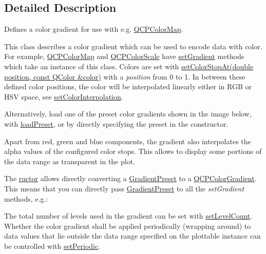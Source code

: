 \subsection{Detailed Description}
Defines a color gradient for use with e.\+g. \hyperlink{class_q_c_p_color_map}{Q\+C\+P\+Color\+Map}. 

This class describes a color gradient which can be used to encode data with color. For example, \hyperlink{class_q_c_p_color_map}{Q\+C\+P\+Color\+Map} and \hyperlink{class_q_c_p_color_scale}{Q\+C\+P\+Color\+Scale} have \hyperlink{class_q_c_p_color_map_a7313c78360471cead3576341a2c50377}{set\+Gradient} methods which take an instance of this class. Colors are set with \hyperlink{class_q_c_p_color_gradient_a3b48be5e78079db1bb2a1188a4c3390e}{set\+Color\+Stop\+At(double position, const Q\+Color \&color)} with a {\itshape position} from 0 to 1. In between these defined color positions, the color will be interpolated linearly either in R\+GB or H\+SV space, see \hyperlink{class_q_c_p_color_gradient_aa13fda86406e1d896a465a409ae63b38}{set\+Color\+Interpolation}.

Alternatively, load one of the preset color gradients shown in the image below, with \hyperlink{class_q_c_p_color_gradient_aa0aeec1528241728b9671bf8e60b1622}{load\+Preset}, or by directly specifying the preset in the constructor.

Apart from red, green and blue components, the gradient also interpolates the alpha values of the configured color stops. This allows to display some portions of the data range as transparent in the plot.



The \hyperlink{class_q_c_p_color_gradient}{ructor} allows directly converting a \hyperlink{class_q_c_p_color_gradient_aed6569828fee337023670272910c9072}{Gradient\+Preset} to a \hyperlink{class_q_c_p_color_gradient}{Q\+C\+P\+Color\+Gradient}. This means that you can directly pass \hyperlink{class_q_c_p_color_gradient_aed6569828fee337023670272910c9072}{Gradient\+Preset} to all the {\itshape set\+Gradient} methods, e.\+g.\+: 
\begin{DoxyCodeInclude}
\end{DoxyCodeInclude}
 The total number of levels used in the gradient can be set with \hyperlink{class_q_c_p_color_gradient_a18da587eb4f7fc788ea28ba15b6a12de}{set\+Level\+Count}. Whether the color gradient shall be applied periodically (wrapping around) to data values that lie outside the data range specified on the plottable instance can be controlled with \hyperlink{class_q_c_p_color_gradient_a39d6448155fc00a219f239220d14bb39}{set\+Periodic}. 

